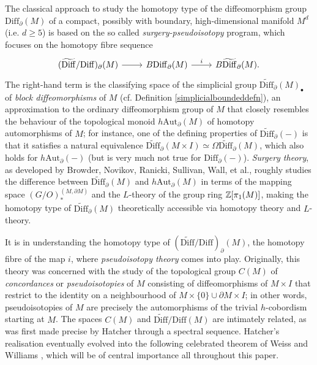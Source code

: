 \documentclass[a4paper, oneside]{amsart}
\newcommand{\diff}{\mathrm{Diff}}
\newcommand{\bdiff}{\widetilde{\mathrm{Diff}}}
\newcommand{\1}{\mathds{1}}
\theoremstyle{remark}
\theoremstyle{definition}
\newcommand{\Z}{{\scaleobj{0.97}{\mathbb{Z}}}}
\numberwithin{equation}{section}
\begin{document}
The classical approach to study the homotopy type of the diffeomorphism group $\diff_\partial(M)$ of a compact, possibly with boundary, high-dimensional manifold $M^d$ (i.e. $d\geq 5$) is based on the so called \textit{surgery-pseudoisotopy} program, which focuses on the homotopy fibre sequence
\begin{equation}
\begin{tikzcd}\label{bdiffmoddiffsequence}
(\bdiff/\diff)_\partial(M)\rar & B\diff_\partial(M)\rar["i"] & B\bdiff_\partial(M).
\end{tikzcd}
\end{equation}
The right-hand term is the classifying space of the simplicial group $\bdiff_\partial(M)_\bullet$ of \textit{block diffeomorphisms} of $M$ (cf. Definition \ref{simplicialboundeddefn}), an approximation to the ordinary diffeomorphism group of $M$ that closely resembles the behaviour of the topological monoid $h\mathrm{Aut}_\partial(M)$ of homotopy automorphisms of $M$; for instance, one of the defining properties of $\bdiff_\partial(-)$ is that it satisfies a natural equivalence $\bdiff_\partial(M\times I)\simeq \Omega\bdiff_\partial(M)$, which also holds for $h\mathrm{Aut}_\partial(-)$ (but is very much not true for $\diff_\partial(-)$). \textit{Surgery theory}, as developed by Browder, Novikov, Ranicki, Sullivan, Wall, et al., roughly studies the difference between $\bdiff_\partial(M)$ and $h\mathrm{Aut}_\partial(M)$ in terms of the mapping space $(G/O)_*^{(M,\partial M)}$ and the $L$-theory of the group ring $\Z[\pi_1(M)]$, making the homotopy type of $\bdiff_\partial(M)$ theoretically accessible via homotopy theory and $L$-theory.

It is in understanding the homotopy type of $(\bdiff/\diff)_\partial(M)$, the homotopy fibre of the map $i$, where \textit{pseudoisotopy theory} \cite{IgusaConcordanceStability,HatcherWag} comes into play. Originally, this theory was concerned with the study of the topological group $C(M)$ of \textit{concordances} or \textit{pseudoisotopies} of $M$ consisting of diffeomorphisms of $M\times I$ that restrict to the identity on a neighbourhood of $M\times\{0\}\cup \partial M\times I$; in other words, pseudoisotopies of $M$ are precisely the automorphisms of the trivial $h$-cobordism starting at $M$. The spaces $C(M)$ and $\bdiff/\diff(M)$ are intimately related, as was first made precise by Hatcher \cite[Prop. 2.1]{HatcherSSeq} through a spectral sequence. Hatcher's realisation eventually evolved into the following celebrated theorem of Weiss and Williams \cite[Thm. A]{WWI}, which will be of central importance all throughout this paper.
\end{document}
